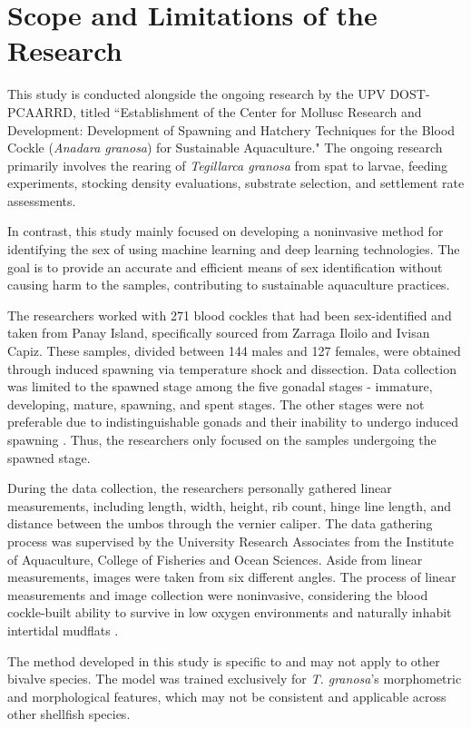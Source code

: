 \section{Scope and Limitations of the Research}
\label{sec:scopelimitations}

This study is conducted alongside the ongoing research by the UPV DOST-PCAARRD, titled ``Establishment of the Center for Mollusc Research and Development: Development of Spawning and Hatchery Techniques for the Blood Cockle (\textit{Anadara granosa}) for Sustainable Aquaculture." The ongoing research primarily involves the rearing of \textit{Tegillarca granosa} from spat to larvae, feeding experiments, stocking density evaluations, substrate selection, and settlement rate assessments.

In contrast, this study mainly focused on developing a noninvasive method for identifying the sex of \Tgranosa using machine learning and deep learning technologies. The goal is to provide an accurate and efficient means of sex identification without causing harm to the samples, contributing to sustainable aquaculture practices.

The researchers worked with 271  blood cockles that had been sex-identified and taken from Panay Island, specifically sourced from Zarraga Iloilo and Ivisan Capiz. These samples, divided between 144 males and 127 females, were obtained through induced spawning via temperature shock and dissection. Data collection was limited to the spawned stage among the five gonadal stages  - immature, developing, mature, spawning, and spent stages. The other stages were not preferable due to indistinguishable gonads and their inability to undergo induced spawning \cite{may2021}.  Thus, the researchers only focused on the samples undergoing the spawned stage. 

During the data collection,  the researchers personally gathered linear measurements, including length, width, height, rib count, hinge line length, and distance between the umbos through the vernier caliper. The data gathering process was supervised by the University Research Associates from the Institute of Aquaculture, College of Fisheries and Ocean Sciences. Aside from linear measurements, images were taken from six different angles. The process of linear measurements and image collection were noninvasive, considering the blood cockle-built ability to survive in low oxygen environments and naturally inhabit intertidal mudflats \cite{zhan2022}.

The method developed in this study is specific to \Tgranosa and may not apply to other bivalve species. The model was trained exclusively for \textit{T. granosa}'s morphometric and morphological features, which may not be consistent and applicable across other shellfish species. 

